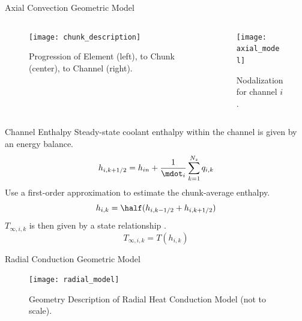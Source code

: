 \begin{frame}{Axial Convection Geometric Model}
  \begin{columns}
    \begin{column}{0.5\textwidth}
      \begin{figure}
        \centering
        \texttt{[image: chunk\_description]}
        \caption{Progression of Element (left), to Chunk (center), to Channel
          (right).}
        \label{fig:chunk_description}
      \end{figure}
    \end{column}
    \begin{column}{0.5\textwidth}
      \begin{figure}
        \centering
        \texttt{[image: axial\_model]}
        \caption{Nodalization for channel $i$.}
        \label{fig:axial_model}
      \end{figure}
    \end{column}
  \end{columns}
\end{frame}

\begin{frame}{Channel Enthalpy}
  Steady-state coolant enthalpy within the channel is given by an energy
  balance.
  \begin{equation}
    h_{i,k+1/2} = h_{in} + \frac{1}{\mdot_i} \sum_{k=1}^{N_z} q_{i,k}
  \end{equation}
  Use a first-order approximation to estimate the chunk-average enthalpy.
  \begin{equation}
    h_{i,k} = \half (h_{i,k-1/2}+h_{i,k+1/2})
  \end{equation}
  $T_{\infty,i,k}$ is then given by a state relationship \cite{sodiumProp}.
  \begin{equation}
    T_{\infty,i,k} = T(h_{i,k})
  \end{equation}
\end{frame}

\begin{frame}{Radial Conduction Geometric Model}
  \begin{figure}
    \centering
    \texttt{[image: radial\_model]}
    \caption{Geometry Description of Radial Heat Conduction Model (not to
      scale).}
    \label{fig:radial_model}
  \end{figure}
\end{frame}

